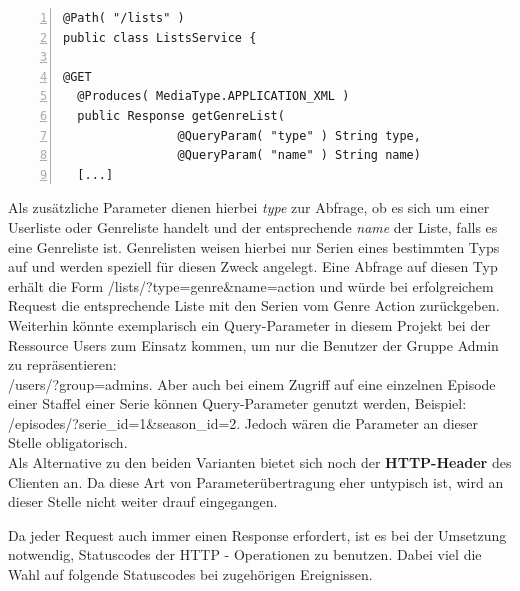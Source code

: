 \begin{lstlisting}[basicstyle=\ttfamily,numbers=left,numberstyle=\footnotesize\ttfamily,backgroundcolor=\color{source},label=listsservice,caption=Auszug aus ListsService mit QueryParam]
@Path( "/lists" )
public class ListsService {

@GET
  @Produces( MediaType.APPLICATION_XML )
  public Response getGenreList(
                @QueryParam( "type" ) String type,
                @QueryParam( "name" ) String name)
  [...]
\end{lstlisting}

Als zusätzliche Parameter dienen hierbei \textit{type} zur Abfrage, ob es sich um einer Userliste oder Genreliste handelt und der entsprechende \textit{name} der Liste, falls es eine Genreliste ist.
Genrelisten weisen hierbei nur Serien eines bestimmten Typs auf und werden speziell für diesen Zweck angelegt. Eine Abfrage auf diesen Typ erhält die Form \textsf{/lists/?type=genre\&name=action} und würde bei erfolgreichem Request die entsprechende Liste mit den Serien vom Genre Action zurückgeben.
\\
Weiterhin könnte exemplarisch  ein Query-Parameter in diesem Projekt bei der Ressource Users zum Einsatz kommen, um nur die Benutzer der Gruppe Admin zu repräsentieren:\\ \textsf{/users/?group=admins}. Aber auch bei einem Zugriff auf eine einzelnen Episode einer Staffel einer Serie können Query-Parameter genutzt werden, Beispiel: \textsf{/episodes/?serie\_id=1\&season\_id=2}. Jedoch wären die Parameter an dieser Stelle obligatorisch.
\\
Als Alternative zu den beiden Varianten bietet sich noch der \textbf{HTTP-Header} des Clienten an. Da diese Art von Parameterübertragung eher untypisch ist, wird an dieser Stelle nicht weiter drauf eingegangen.

\vspace{0.2cm}

Da jeder Request auch immer einen Response erfordert, ist es bei der Umsetzung notwendig, Statuscodes der HTTP - Operationen zu benutzen. Dabei viel die Wahl auf folgende Statuscodes bei zugehörigen Ereignissen.

